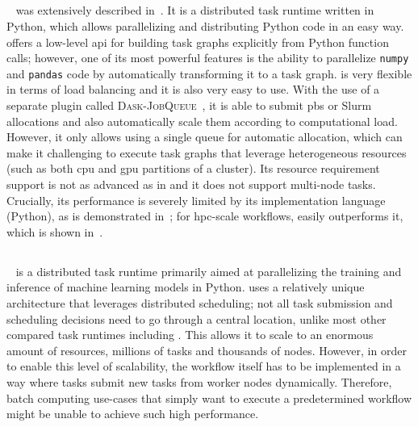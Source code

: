 \begin{spacing}{1}
\subsection*{\dask}
\dask~\cite{dask} was extensively described in~. It is a
distributed task runtime written in Python, which allows parallelizing and distributing Python code
in an easy way. \dask{} offers a low-level \gls{api} for building
task graphs explicitly from Python function calls; however, one of its most powerful features is the
ability to parallelize \texttt{numpy} and \texttt{pandas} code by automatically
transforming it to a task graph. \dask{} is very flexible in terms of load
balancing and it is also very easy to use. With the use of a separate plugin called
\textsc{Dask-JobQueue}~\cite{dask-jobqueue}, it is able to submit \gls{pbs} or
Slurm allocations and also automatically scale them according to computational load. However, it
only allows using a single queue for automatic allocation, which can make it challenging to execute
task graphs that leverage heterogeneous resources (such as both \gls{cpu} and
\gls{gpu} partitions of a cluster). Its resource requirement support is not as advanced as in \hyperqueue{} and it does not
support multi-node tasks. Crucially, its performance is severely limited by its implementation
language (Python), as is demonstrated in~; for \gls{hpc}-scale
workflows, \hyperqueue{} easily outperforms it, which is shown
in~.

\subsection*{\ray}
\ray~\cite{ray} is a distributed task runtime primarily aimed at parallelizing the
training and inference of machine learning models in Python. \ray{} uses a
relatively unique architecture that leverages distributed scheduling; not all task submission and
scheduling decisions need to go through a central location, unlike most other compared task runtimes including \hyperqueue{}. This allows it to scale to an
enormous amount of resources, millions of tasks and thousands of nodes. However, in order to enable
this level of scalability, the workflow itself has to be implemented in a way where tasks submit
new tasks from worker nodes dynamically. Therefore, batch computing use-cases that simply want to
execute a predetermined workflow might be unable to achieve such high performance.


\end{spacing}
